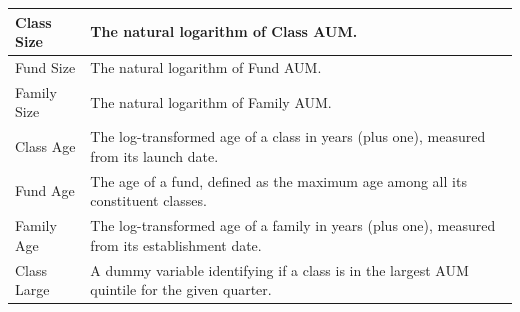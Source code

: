 \begin{longtable}{lp{}}
    \midrule
    Class Size                    & The natural logarithm of Class AUM\@.                                                                                                                                                                                                                                                                               \\
    \midrule
    Fund Size                     & The natural logarithm of Fund AUM\@.                                                                                                                                                                                                                                                                                \\
    \midrule
    Family Size                   & The natural logarithm of Family AUM\@.                                                                                                                                                                                                                                                                              \\
    \midrule
    Class Age                      & The log-transformed age of a class in years (plus one), measured from its launch date.                                                                                                                                                                                                                            \\
    \midrule
    Fund Age                       & The age of a fund, defined as the maximum age among all its constituent classes.                                                                                                                                                                                                                                  \\
    \midrule
    Family Age                     & The log-transformed age of a family in years (plus one), measured from its establishment date.                                                                                                                                                                                                                    \\
    \midrule
    Class Large                    & A dummy variable identifying if a class is in the largest AUM quintile for the given quarter.                                                                                                                                                                                                                     \\

\end{longtable}
